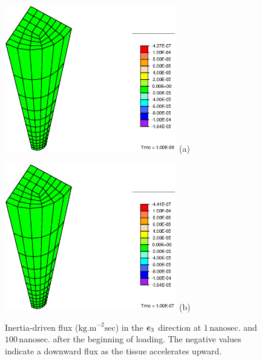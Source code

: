 \begin{figure}[!hpt]
\begin{minipage}[t]{7.5cm}
{\includegraphics[width=7.5cm]{images/examples/lagrangian/preliminary/M4-1}} \hskip 3cm (a)
\end{minipage}
\begin{minipage}[t]{7.5cm}
{\includegraphics[width=7.5cm]{images/examples/lagrangian/preliminary/M4-100}} \hskip 3cm (b)
\end{minipage}
\caption{Inertia-driven flux ($\mathrm{kg.m}^{-2}\mathrm{sec}$) in
the $\mbox{\boldmath$ e$}_3$ direction at $1 \,\mathrm{nanosec.}$ and
$100\,\mathrm{nanosec.}$ after the beginning of loading. The
negative values indicate a downward flux as the tissue accelerates
upward.} \label{M4fig}
\end{figure}


